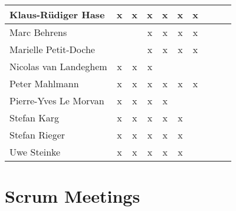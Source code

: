 \documentclass[a4paper, 11pt]{article}
\begin{document}
\begin{tabular}{|l|c|c|c||c|c|c||c|c|c|}
Klaus-R\"udiger Hase & x & x & x & x & x & x \\\hline
Marc Behrens         &   &   & x & x & x & x \\\hline
Marielle Petit-Doche &   &   & x & x & x & x \\\hline
Nicolas van Landeghem& x & x & x &   &   &   \\\hline
Peter Mahlmann       & x & x & x & x & x & x \\\hline
Pierre-Yves Le Morvan& x & x & x & x &   &   \\\hline
Stefan Karg          & x & x & x & x & x &   \\\hline
Stefan Rieger        & x & x & x & x & x &   \\\hline
Uwe Steinke          & x & x & x & x & x &   \\\hline
\end{tabular}


\section{Scrum Meetings}
\end{document}
